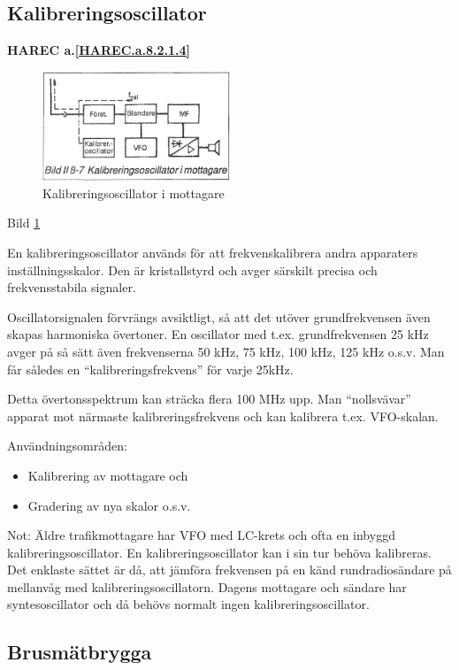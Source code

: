 \subsection{Kalibreringsoscillator}
\textbf{
HAREC a.\ref{HAREC.a.8.2.1.4}\label{myHAREC.a.8.2.1.4}
}

\begin{figure}
  \includegraphics[width=0.5\textwidth]{images/bild_2_8-07}
  \caption{Kalibreringsoscillator i mottagare}
  \label{fig:bildII8-7}
\end{figure}

Bild \ref{fig:bildII8-7}

En kalibreringsoscillator används för att frekvenskalibrera andra
apparaters inställningsskalor.  Den är kristallstyrd och avger
särskilt precisa och frekvensstabila signaler.

Oscillatorsignalen förvrängs avsiktligt, så att det utöver
grundfrekvensen även skapas harmoniska övertoner. En oscillator med
t.ex. grundfrekvensen 25 kHz avger på så sätt även frekvenserna 50
kHz, 75 kHz, 100 kHz, 125 kHz o.s.v. Man får således en
``kalibreringsfrekvens'' för varje 25kHz.

Detta övertonsspektrum kan sträcka flera 100 MHz upp. Man
``nollsvävar'' apparat mot närmaste kalibreringsfrekvens och kan
kalibrera t.ex. VFO-skalan.

Användningsområden:
\begin{itemize}
\item Kalibrering av mottagare och
\item Gradering av nya skalor o.s.v.
\end{itemize}

Not: Äldre trafikmottagare har VFO med LC-krets och ofta en inbyggd
kalibreringsoscillator. En kalibreringsoscillator kan i sin tur behöva
kalibreras. Det enklaste sättet är då, att jämföra frekvensen på en
känd rundradiosändare på mellanvåg med kalibreringsoscillatorn.
Dagens mottagare och sändare har syntesoscillator och då behövs
normalt ingen kalibreringsoscillator.

\subsection{Brusmätbrygga}

